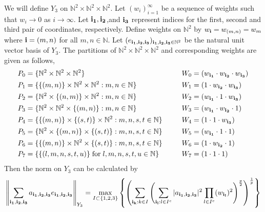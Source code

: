 \documentclass[12pt]{amsart}
\theoremstyle{definition}
\theoremstyle{remark}
\numberwithin{equation}{section}
\begin{document}
 We will define $Y_3$ on
 ${\mathbb{N}}^2 \times {\mathbb{N}}^2\times {\mathbb{N}}^2$.
 Let $(w_i)_{i=1}^{\infty}$ be a sequence of weights such that 
$w_i \rightarrow 0$ as $i\rightarrow \infty$.
 Let $\bf{i_1}, \bf{i_2}$,and $\bf{i_3}$ represent indices for the first,
 second and third pair of coordinates, respectively.
Define weights on ${\mathbb{N}}^2$ by $w_{\bf{i}}=w_{(m,n)}=w_m$ where 
${\bf{i}}=(m,n)$ for all $m,n\in \mathbb{N}$.
 Let $(e_{\bf{i_1,i_2,i_3}})_{{\bf{i_1,i_2,i_3}}\in {\mathbb{N}}^2}$ be the
natural unit vector basis of $Y_3$.
The partitions of 
${\mathbb{N}}^2 \times {\mathbb{N}}^2\times {\mathbb{N}}^2$ 
and corresponding weights are given as follows,
\begin{alignat*}{3}
P_0&=\{{\mathbb{N}}^2\times{\mathbb{N}}^2\times
{\mathbb{N}}^2\}
&W_0&=(w_{\bf{i_1}} \cdot w_{\bf{i_2}} \cdot w_{\bf{i_3}})\\
P_1&=\{\{(m,n)\}\times{\mathbb{N}}^2\times{\mathbb{N}}^2: m,n\in{\mathbb{N}}
\}
&W_1&=(1\cdot w_{\bf{i_2}} \cdot w_{\bf{i_3}})\\
P_2&=\{{\mathbb{N}}^2\times\{(n,m)\}\times{\mathbb{N}}^2:
m,n\in{\mathbb{N}}\}
&W_2&=(w_{\bf{i_1}} \cdot 1 \cdot w_{\bf{i_3}})\\
P_3&=\{{\mathbb{N}}^2\times{\mathbb{N}}^2\times\{(m,n)\}:
m,n\in{\mathbb{N}}\}
&W_3&=(w_{\bf{i_1}} \cdot w_{\bf{i_2}} \cdot 1)\\
P_4&=\{\{(m,n)\}\times\{(s,t)\}\times{\mathbb{N}}^2:
m,n,s,t\in{\mathbb{N}}\}
&W_4&=(1\cdot 1 \cdot w_{\bf{i_3}})\\
P_5&=\{{\mathbb{N}}^2\times\{(m,n)\}\times
\{(s,t)\}:m,n,s,t\in{\mathbb{N}}\}
&W_5&=(w_{\bf{i_1}} \cdot 1 \cdot 1)\\
P_6&=\{\{(m,n)\}\times{\mathbb{N}}^2\times\{(s,t)\}:
 m,n,s,t \in {\mathbb{N}}\}\phantom{xxx}
&W_6&=(1\cdot w_{\bf{i_2}} \cdot 1)\\
P_7&=\{\{(l,m,n,s,t,u)\}\;\text{for}\;
l,m,n,s,t,u\in{\mathbb{N}}\}
&W_7&=(1\cdot 1 \cdot 1)
\end{alignat*}
Then the norm on $Y_3$ can be calculated by\\
\begin{equation*}\left\|\sum_{\bf{i_1,i_2,i_3}}
a_{\bf{i_1,i_2,i_3}}e_{\bf{i_1,i_2,i_3}}\right\|_{Y_3}
=\max_{I\subset \{1,2,3\}}\left\{
\left(\sum_{{\bf{i_k}}:k\in I}
\left(\sum_{{\bf{i_l}}:l\in {I^{c}}}|a_{\bf{i_1,i_2,i_3}}|^2
\prod_{l\in{I^{c}}}(w_{\bf{i_l}})^{2}\right)^{\frac{p}{2}}
\right)^{\frac{1}{p}}
\right\}
\end{equation*}
\end{document}
